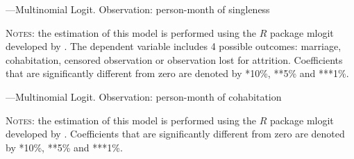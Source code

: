 \documentclass[12pt]{article}
\begin{document}
\begin{table}[htbp]\centering
\setlength{\tabcolsep}{16pt}
\caption{---Multinomial Logit. Observation: person-month of singleness}
\label{table:mpc_sing}
\begin{threeparttable}[t]\centering

\begin{tablenotes}[flushleft]
\footnotesize{\item \textsc{Notes}: the estimation of this model is performed using the $R$ package mlogit developed by \cite{croissant2012}. The dependent variable includes 4 possible outcomes: marriage, cohabitation, censored observation or observation lost for attrition. Coefficients that are significantly different from zero are denoted by *10\%, **5\%  and ***1\%.}
\end{tablenotes}
\end{threeparttable}
\end{table}
\FloatBarrier

\begin{table}[htbp]\centering
\setlength{\tabcolsep}{16pt}
\caption{---Multinomial Logit. Observation: person-month of cohabitation}
\label{table:mpc_coh}
\begin{threeparttable}[t]\centering

\begin{tablenotes}[flushleft]
\footnotesize{\item \textsc{Notes}: the estimation of this model is performed using the $R$ package mlogit developed by \cite{croissant2012}. Coefficients that are significantly different from zero are denoted by *10\%, **5\%  and ***1\%.}
\end{tablenotes}
\end{threeparttable}
\end{table}
\FloatBarrier
\end{document}
